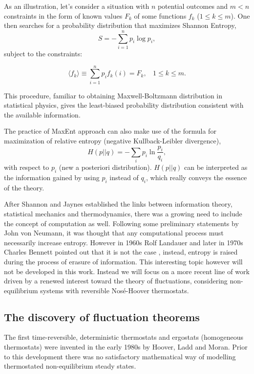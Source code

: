 \documentclass[a4paper,12pt]{article}
\begin{document}
As an illustration, let's consider a situation with $n$ potential outcomes and $m<n$ constraints in the form of known values $F_k$ of some functions $f_k$ ($1 \leq k \leq m$).
One then searches for a probability distribution that maximizes Shannon Entropy,
\begin{equation}
  S=-\sum_{i=1}^n p_i \log p_i,
\end{equation}
subject to the constraints:

\begin{equation}
  \langle f_k \rangle \equiv \sum_{i=1}^n p_i f_k(i)=F_k,\ \ \ \  1\leq k \leq m.
\end{equation}

This procedure, familiar to obtaining Maxwell-Boltzmann distribution in statistical physics, gives the least-biased probability distribution consistent with the available information.

The practice of MaxEnt approach can also make use of the formula for maximization of relative entropy (negative Kullback-Leibler divergence),
\begin{equation}
\label{Kullback-Leibler}
    H(p || q) = -\sum_i p_i \ln \frac{p_i}{q_i},
\end{equation}
with respect to $p_i$ (new a posteriori distribution). $H(p||q)$ can be interpreted as the information gained by using $p_i$ instead of $q_i$, which really conveys the essence of the theory.


After Shannon and Jaynes established the links between information theory, statistical mechanics and thermodynamics, there was a growing need to include the concept of computation as well. Following some preliminary statements by John von Neumann, it was thought that any computational process must necessarily increase entropy.
However in 1960s Rolf Landauer and later in 1970s Charles Bennett pointed out that it is not the case \cite{Landauer:2002wc, Bennett:1973ko}, instead, entropy is raised during the process of erasure of information. This interesting topic however will not be developed in this work. Instead we will focus on a more recent line of work driven by a renewed interest toward the theory of fluctuations, considering non-equilibrium systems with reversible Nosé-Hoover thermostats.
\subsection{The discovery of fluctuation theorems}
The first time-reversible, deterministic thermostats and ergostats (homogeneous thermostats) were invented in the early 1980s by Hoover, Ladd and Moran\cite{Hoover:1982dp}. Prior to this development there was no satisfactory mathematical way of modelling thermostated non-equilibrium steady states.
\end{document}
